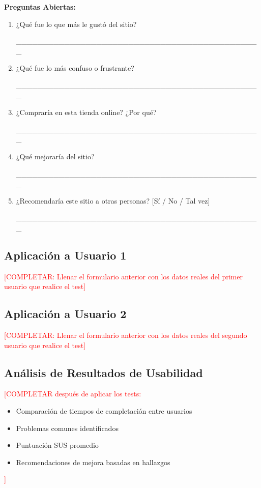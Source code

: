 \documentclass[12pt,a4paper]{article}
\begin{document}
\textbf{Preguntas Abiertas:}

\begin{enumerate}
    \item ¿Qué fue lo que más le gustó del sitio?

    \_\_\_\_\_\_\_\_\_\_\_\_\_\_\_\_\_\_\_\_\_\_\_\_\_\_\_\_\_\_\_\_\_\_\_\_\_\_\_\_\_\_\_\_\_\_

    \item ¿Qué fue lo más confuso o frustrante?

    \_\_\_\_\_\_\_\_\_\_\_\_\_\_\_\_\_\_\_\_\_\_\_\_\_\_\_\_\_\_\_\_\_\_\_\_\_\_\_\_\_\_\_\_\_\_

    \item ¿Compraría en esta tienda online? ¿Por qué?

    \_\_\_\_\_\_\_\_\_\_\_\_\_\_\_\_\_\_\_\_\_\_\_\_\_\_\_\_\_\_\_\_\_\_\_\_\_\_\_\_\_\_\_\_\_\_

    \item ¿Qué mejoraría del sitio?

    \_\_\_\_\_\_\_\_\_\_\_\_\_\_\_\_\_\_\_\_\_\_\_\_\_\_\_\_\_\_\_\_\_\_\_\_\_\_\_\_\_\_\_\_\_\_

    \item ¿Recomendaría este sitio a otras personas? [Sí / No / Tal vez]

    \_\_\_\_\_\_\_\_\_\_\_\_\_\_\_\_\_\_\_\_\_\_\_\_\_\_\_\_\_\_\_\_\_\_\_\_\_\_\_\_\_\_\_\_\_\_
\end{enumerate}

\subsection{Aplicación a Usuario 1}

\textcolor{red}{[COMPLETAR: Llenar el formulario anterior con los datos reales del primer usuario que realice el test]}

\subsection{Aplicación a Usuario 2}

\textcolor{red}{[COMPLETAR: Llenar el formulario anterior con los datos reales del segundo usuario que realice el test]}

\subsection{Análisis de Resultados de Usabilidad}

\textcolor{red}{[COMPLETAR después de aplicar los tests:}
\begin{itemize}
    \item Comparación de tiempos de completación entre usuarios
    \item Problemas comunes identificados
    \item Puntuación SUS promedio
    \item Recomendaciones de mejora basadas en hallazgos
\end{itemize}
\textcolor{red}{]}
\end{document}
